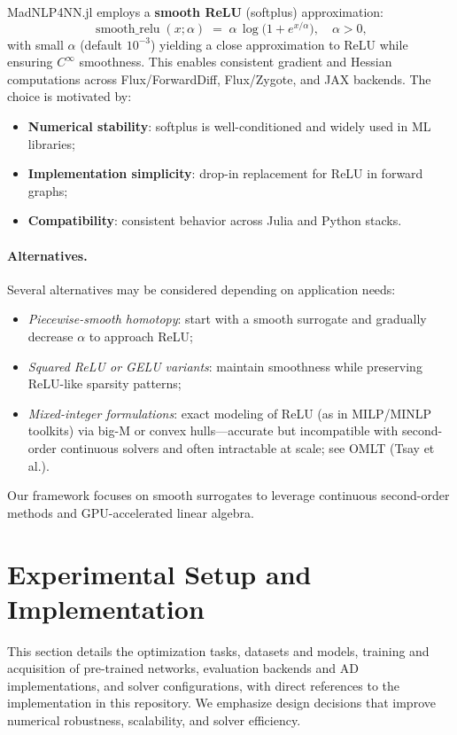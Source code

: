 \documentclass[11pt]{article}
\begin{document}
MadNLP4NN.jl employs a \textbf{smooth ReLU} (softplus) approximation:
\begin{equation}
  \label{eq:smooth-relu}
  \operatorname{smooth\_relu}(x; \alpha) \;=\; \alpha\, \log\big(1 + e^{x/\alpha}\big), \quad \alpha > 0,
\end{equation}
with small $\alpha$ (default $10^{-3}$) yielding a close approximation to ReLU while ensuring $C^\infty$ smoothness. This enables consistent gradient and Hessian computations across Flux/ForwardDiff, Flux/Zygote, and JAX backends. The choice is motivated by:
\begin{itemize}[leftmargin=1.5em]
  \item \textbf{Numerical stability}: softplus is well-conditioned and widely used in ML libraries;
  \item \textbf{Implementation simplicity}: drop-in replacement for ReLU in forward graphs;
  \item \textbf{Compatibility}: consistent behavior across Julia and Python stacks.
\end{itemize}

\paragraph{Alternatives.} Several alternatives may be considered depending on application needs:
\begin{itemize}[leftmargin=1.5em]
  \item \emph{Piecewise-smooth homotopy}: start with a smooth surrogate and gradually decrease $\alpha$ to approach ReLU; 
  \item \emph{Squared ReLU or GELU variants}: maintain smoothness while preserving ReLU-like sparsity patterns;
  \item \emph{Mixed-integer formulations}: exact modeling of ReLU (as in MILP/MINLP toolkits) via big-M or convex hulls---accurate but incompatible with second-order continuous solvers and often intractable at scale; see OMLT (Tsay et al.).
\end{itemize}
Our framework focuses on smooth surrogates to leverage continuous second-order methods and GPU-accelerated linear algebra.

\section{Experimental Setup and Implementation}
This section details the optimization tasks, datasets and models, training and acquisition of pre-trained networks, evaluation backends and AD implementations, and solver configurations, with direct references to the implementation in this repository. We emphasize design decisions that improve numerical robustness, scalability, and solver efficiency.
\end{document}

